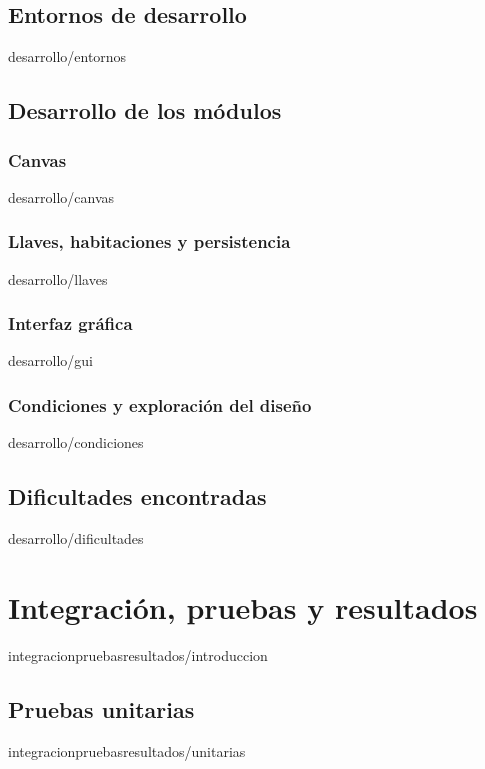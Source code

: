 \documentclass[epsbased,copyright,final,printable,covers,extendedindex,firstnumbered,tfg,gnuplot]{tfgtfmthesisuam}
\begin{document}
	\section{Entornos de desarrollo\label{SEC:ENTORNOS}}{desarrollo/entornos}
	\section{Desarrollo de los módulos\label{SEC:DEVMODULOS}}
		\subsection{Canvas\label{SUBSEC:DEVCANVAS}}{desarrollo/canvas}
		\subsection{Llaves, habitaciones y persistencia\label{SUBSEC:DEVLLAVES}}{desarrollo/llaves}
		\subsection{Interfaz gráfica\label{SUBSEC:DEVGUI}}{desarrollo/gui}
		\subsection{Condiciones y exploración del diseño\label{SUBSEC:CONDICIONES}}{desarrollo/condiciones}
	\section{Dificultades encontradas\label{SEC:DIFICULTADES}}{desarrollo/dificultades}

\chapter{Integración, pruebas y resultados\label{CAP:INTEGRACIONPRUEBASYRESULTADOS}}{integracionpruebasresultados/introduccion}
	\section{Pruebas unitarias\label{SEC:PRUEBASUNITARIAS}}{integracionpruebasresultados/unitarias}
\end{document}
